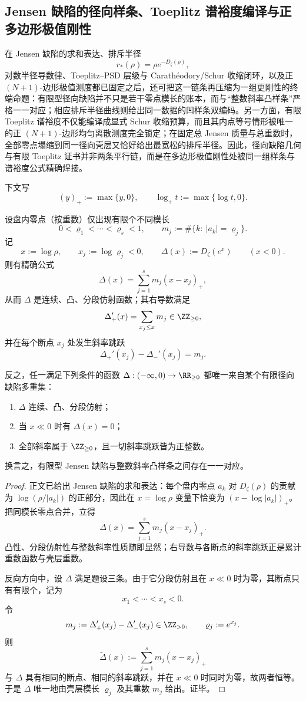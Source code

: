\subsection{Jensen 缺陷的径向样条、Toeplitz 谱裕度编译与正多边形极值刚性}\label{subsec:conclusion-jensen-spline-toeplitz-schur-polygon-rigidity}

在 Jensen 缺陷的求和表达、排斥半径
\[
r_*(\rho)=\rho e^{-D_\zeta(\rho)},
\]
对数半径导数律、Toeplitz--PSD 层级与 Carath\'eodory/Schur 收缩闭环，以及正 \((N+1)\)-边形极值测度都已固定之后，还可把这一链条再压缩为一组更刚性的终端命题：有限型径向缺陷并不只是若干零点模长的账本，而与“整数斜率凸样条”严格一一对应；相应排斥半径曲线则给出同一数据的凹样条双编码。另一方面，有限 Toeplitz 谱裕度不仅能编译成显式 Schur 收缩预算，而且其内点等号情形被唯一的正 \((N+1)\)-边形均匀离散测度完全锁定；在固定总 Jensen 质量与总重数时，全部零点塌缩到同一径向壳层又恰好给出最宽松的排斥半径。因此，径向缺陷几何与有限 Toeplitz 证书并非两条平行链，而是在多边形极值刚性处被同一组样条与谱裕度公式精确焊接。

下文写
\[
(y)_+:=\max\{y,0\},
\qquad
\log_+ t:=\max\{\log t,0\}.
\]

\begin{theorem}\label{thm:conclusion-jensen-defect-radial-spline-rigidity}
设盘内零点（按重数）仅出现有限个不同模长
\[
0<\varrho_1<\cdots<\varrho_s<1,
\qquad
m_j:=\#\{k:\ |a_k|=\varrho_j\}.
\]
记
\[
x:=\log \rho,
\qquad
x_j:=\log \varrho_j<0,
\qquad
\Delta(x):=D_\zeta(e^x)
\qquad(x<0).
\]
则有精确公式
\[
\Delta(x)=\sum_{j=1}^s m_j(x-x_j)_+,
\]
从而 \(\Delta\) 是连续、凸、分段仿射函数；其右导数满足
\[
\Delta_+'(x)=\sum_{x_j\le x}m_j\in \ZZ_{\ge 0},
\]
并在每个断点 \(x_j\) 处发生斜率跳跃
\[
\Delta_+'(x_j)-\Delta_-'(x_j)=m_j.
\]

反之，任一满足下列条件的函数 \(\Delta:(-\infty,0)\to\RR_{\ge 0}\) 都唯一来自某个有限径向缺陷多重集：
\begin{enumerate}
  \item \(\Delta\) 连续、凸、分段仿射；
  \item 当 \(x\ll 0\) 时有 \(\Delta(x)=0\)；
  \item 全部斜率属于 \(\ZZ_{\ge 0}\)，且一切斜率跳跃皆为正整数。
\end{enumerate}
换言之，有限型 Jensen 缺陷与整数斜率凸样条之间存在一一对应。
\end{theorem}
\begin{proof}
正文已给出 Jensen 缺陷的求和表达：每个盘内零点 \(a_k\) 对 \(D_\zeta(\rho)\) 的贡献为 \(\log(\rho/|a_k|)\) 的正部分，因此在 \(x=\log\rho\) 变量下恰变为 \((x-\log|a_k|)_+\)。把同模长零点合并，立得
\[
\Delta(x)=\sum_{j=1}^s m_j(x-x_j)_+.
\]
凸性、分段仿射性与整数斜率性质随即显然；右导数与各断点的斜率跳跃正是累计重数函数与壳层重数。

反向方向中，设 \(\Delta\) 满足题设三条。由于它分段仿射且在 \(x\ll 0\) 时为零，其断点只有有限个，记为
\[
x_1<\cdots<x_s<0.
\]
令
\[
m_j:=\Delta_+'(x_j)-\Delta_-'(x_j)\in \ZZ_{>0},
\qquad
\varrho_j:=e^{x_j}.
\]
则
\[
\widetilde \Delta(x):=\sum_{j=1}^s m_j(x-x_j)_+
\]
与 \(\Delta\) 具有相同的断点、相同的斜率跳跃，并在 \(x\ll 0\) 时同时为零，故两者恒等。于是 \(\Delta\) 唯一地由壳层模长 \(\varrho_j\) 及其重数 \(m_j\) 给出。证毕。
\end{proof}

